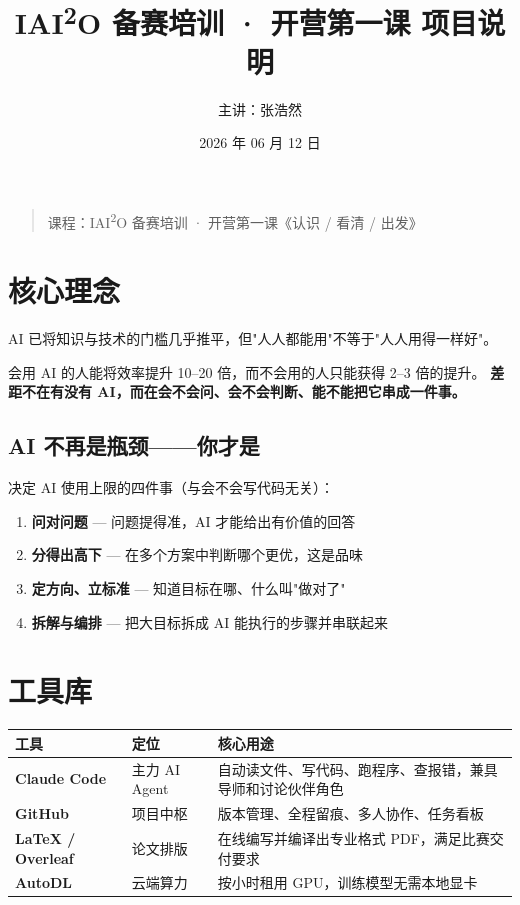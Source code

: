 \documentclass[11pt]{article}
\title{\textbf{IAI\textsuperscript{2}O 备赛培训 · 开营第一课 项目说明}}
\author{主讲：张浩然}
\date{2026 年 06 月 12 日}
\begin{document}
\maketitle

\begin{quote}
课程：IAI\textsuperscript{2}O 备赛培训 · 开营第一课《认识 / 看清 / 出发》
\end{quote}

\section{核心理念}

AI 已将知识与技术的门槛几乎推平，但"人人都能用"不等于"人人用得一样好"。

会用 AI 的人能将效率提升 10--20 倍，而不会用的人只能获得 2--3 倍的提升。
\textbf{差距不在有没有 AI，而在会不会问、会不会判断、能不能把它串成一件事。}

\subsection*{AI 不再是瓶颈——你才是}

决定 AI 使用上限的四件事（与会不会写代码无关）：

\begin{enumerate}
    \item \textbf{问对问题} — 问题提得准，AI 才能给出有价值的回答
    \item \textbf{分得出高下} — 在多个方案中判断哪个更优，这是品味
    \item \textbf{定方向、立标准} — 知道目标在哪、什么叫"做对了"
    \item \textbf{拆解与编排} — 把大目标拆成 AI 能执行的步骤并串联起来
\end{enumerate}

\section{工具库}

\begin{table}[h]
\centering
\begin{tabular}{>{\bfseries}p{3.2cm} p{2.8cm} p{8cm}}
\toprule
工具 & 定位 & 核心用途 \\
\midrule
Claude Code & 主力 AI Agent & 自动读文件、写代码、跑程序、查报错，兼具导师和讨论伙伴角色 \\
GitHub & 项目中枢 & 版本管理、全程留痕、多人协作、任务看板 \\
LaTeX / Overleaf & 论文排版 & 在线编写并编译出专业格式 PDF，满足比赛交付要求 \\
AutoDL & 云端算力 & 按小时租用 GPU，训练模型无需本地显卡 \\
\bottomrule
\end{tabular}
\end{table}
\end{document}
